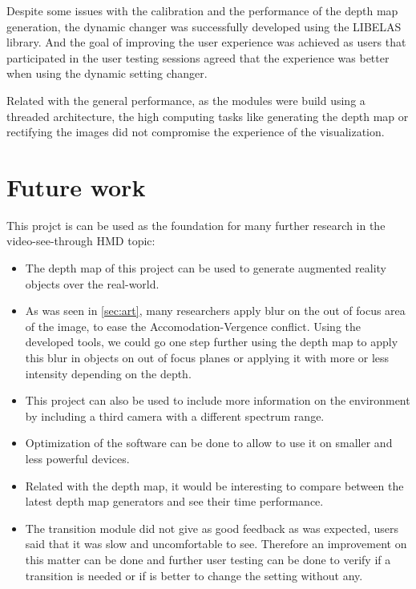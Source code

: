 \documentclass[10pt,a4paper,twocolumn,twoside]{article}
\begin{document}
	Despite some issues with the calibration and the performance of the depth map generation, the dynamic changer was successfully developed using the LIBELAS library. And the goal of improving the user experience was achieved as users that participated in the user testing sessions agreed that the experience was better when using the dynamic setting changer. 
	
	Related with the general performance, as the modules were build using a threaded architecture, the high computing tasks like generating the depth map or rectifying the images did not compromise the experience of the visualization. 
	
	
	\section{Future work}
	This projct is can be used as the foundation for many further research in the video-see-through HMD topic: 
	
	\begin{itemize}
		\item The depth map of this project can be used to generate augmented reality objects over the real-world.
		
		\item As was seen in \ref{sec:art}, many researchers apply blur on the out of focus area of the image, to ease the Accomodation-Vergence conflict. Using the developed tools, we could go one step further using the depth map to apply this blur in objects on out of focus planes or applying it with more or less intensity depending on the depth. 
		
		\item This project can also be used to include more information on the environment by including a third camera with a different spectrum range.  
		
		\item Optimization of the software can be done to allow to use it on smaller and less powerful devices. 
		
		\item Related with the depth map, it would be interesting to compare between the latest depth map generators and see their time performance. 
		
		\item The transition module did not give as good feedback as was expected, users said that it was slow and uncomfortable to see. Therefore an improvement on this matter can be done and further user testing can be done to verify if a transition is needed or if is better to change the setting without any.
	\end{itemize}
\end{document}
